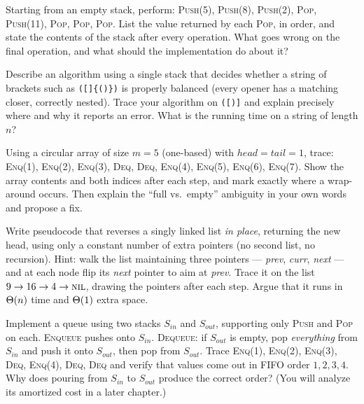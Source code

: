 \begin{exercise}
\label{ch10:ex-stacktrace}
Starting from an empty stack, perform: \textsc{Push}(5), \textsc{Push}(8), \textsc{Push}(2), \textsc{Pop}, \textsc{Push}(11), \textsc{Pop}, \textsc{Pop}, \textsc{Pop}. List the value returned by each \textsc{Pop}, in order, and state the contents of the stack after every operation. What goes wrong on the final operation, and what should the implementation do about it?
\end{exercise}

\begin{exercise}
\label{ch10:ex-brackets}
Describe an algorithm using a single stack that decides whether a string of brackets such as \lstinline|([]{()})| is properly balanced (every opener has a matching closer, correctly nested). Trace your algorithm on \lstinline|([)]| and explain precisely where and why it reports an error. What is the running time on a string of length $n$?
\end{exercise}

\begin{exercise}
\label{ch10:ex-circqueue}
Using a circular array of size $m = 5$ (one-based) with $head = tail = 1$, trace: \textsc{Enq}(1), \textsc{Enq}(2), \textsc{Enq}(3), \textsc{Deq}, \textsc{Deq}, \textsc{Enq}(4), \textsc{Enq}(5), \textsc{Enq}(6), \textsc{Enq}(7). Show the array contents and both indices after each step, and mark exactly where a wrap-around occurs. Then explain the ``full vs.\ empty'' ambiguity in your own words and propose a fix.
\end{exercise}

\begin{exercise}
\label{ch10:ex-reverse}
Write pseudocode that reverses a singly linked list \emph{in place}, returning the new head, using only a constant number of extra pointers (no second list, no recursion). Hint: walk the list maintaining three pointers --- \emph{prev}, \emph{curr}, \emph{next} --- and at each node flip its \emph{next} pointer to aim at \emph{prev}. Trace it on the list $9 \to 16 \to 4 \to \textsc{nil}$, drawing the pointers after each step. Argue that it runs in $\Theta(n)$ time and $\Theta(1)$ extra space.
\end{exercise}

\begin{exercise}
\label{ch10:ex-twostacks}
Implement a queue using two stacks $S_{in}$ and $S_{out}$, supporting only \textsc{Push} and \textsc{Pop} on each. \textsc{Enqueue} pushes onto $S_{in}$. \textsc{Dequeue}: if $S_{out}$ is empty, pop \emph{everything} from $S_{in}$ and push it onto $S_{out}$, then pop from $S_{out}$. Trace \textsc{Enq}(1), \textsc{Enq}(2), \textsc{Enq}(3), \textsc{Deq}, \textsc{Enq}(4), \textsc{Deq}, \textsc{Deq} and verify that values come out in FIFO order $1,2,3,4$. Why does pouring from $S_{in}$ to $S_{out}$ produce the correct order? (You will analyze its amortized cost in a later chapter.)
\end{exercise}

